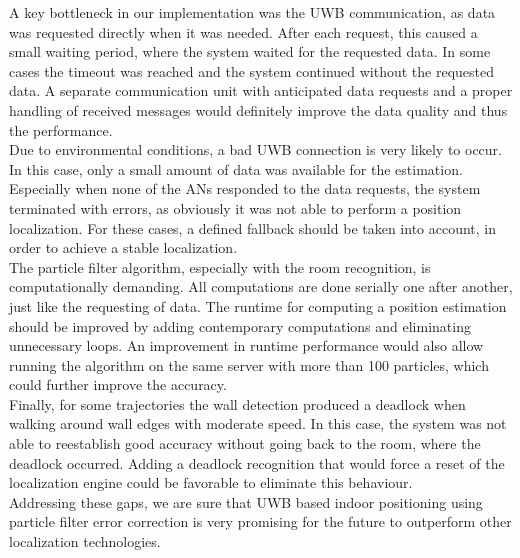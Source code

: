 A key bottleneck in our implementation was the UWB communication, as data was requested directly when it was needed. After each request, this caused a small waiting period, where the system waited for the requested data. In some cases the timeout was reached and the system continued without the requested data. A separate communication unit with anticipated data requests and a proper handling of received messages would definitely improve the data quality and thus the performance.\\
\noindent\hspace*{5mm}%
Due to environmental conditions, a bad UWB connection is very likely to occur. In this case, only a small amount of data was available for the estimation. Especially when none of the ANs responded to the data requests, the system terminated with errors, as obviously it was not able to perform a position localization. For these cases, a defined fallback should be taken into account, in order to achieve a stable localization.\\
\noindent\hspace*{5mm}%
The particle filter algorithm, especially with the room recognition, is computationally demanding. All computations are done serially one after another, just like the requesting of data. The runtime for computing a position estimation should be improved by adding contemporary computations and eliminating unnecessary loops. An improvement in runtime performance would also allow running the algorithm on the same server with more than 100 particles, which could further improve the accuracy.\\
\noindent\hspace*{5mm}%
Finally, for some trajectories the wall detection produced a deadlock when walking around wall edges with moderate speed. In this case, the system was not able to reestablish good accuracy without going back to the room, where the deadlock occurred. Adding a deadlock recognition that would force a reset of the localization engine could be favorable to eliminate this behaviour.\\
\noindent\hspace*{5mm}%
Addressing these gaps, we are sure that UWB based indoor positioning using particle filter error correction is very promising for the future to outperform other localization technologies.